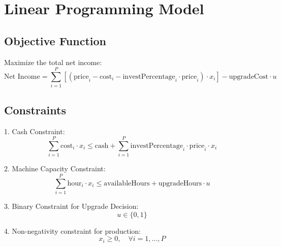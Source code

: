 \documentclass{article}
\begin{document}
\section*{Linear Programming Model}

\subsection*{Objective Function}
Maximize the total net income:
\[
\text{Net Income} = \sum_{i=1}^{P} \left[ ( \text{price}_i - \text{cost}_i - \text{investPercentage}_i \cdot \text{price}_i ) \cdot x_i \right] - \text{upgradeCost} \cdot u
\]

\subsection*{Constraints}
1. Cash Constraint:
\[
\sum_{i=1}^{P} \text{cost}_i \cdot x_i \leq \text{cash} + \sum_{i=1}^{P} \text{investPercentage}_i \cdot \text{price}_i \cdot x_i
\]

2. Machine Capacity Constraint:
\[
\sum_{i=1}^{P} \text{hour}_i \cdot x_i \leq \text{availableHours} + \text{upgradeHours} \cdot u
\]

3. Binary Constraint for Upgrade Decision:
\[
u \in \{0, 1\}
\]

4. Non-negativity constraint for production:
\[
x_i \geq 0, \quad \forall i = 1, ..., P
\]
\end{document}
